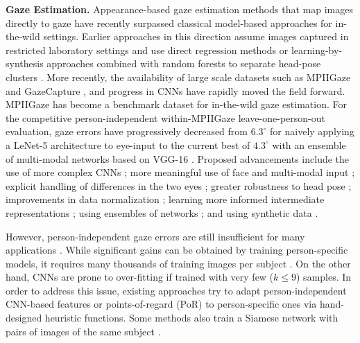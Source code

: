 \documentclass[10pt,twocolumn,letterpaper]{article}
\newcommand{\Paragraph}[1]
{\vspace{1.5mm} \noindent \textbf{#1}}
\begin{document}
\Paragraph{Gaze Estimation.}
Appearance-based gaze estimation \cite{Tan2002WACV} methods that map images directly to gaze have recently surpassed classical model-based approaches \cite{Hansen2010TPAMI} for in-the-wild settings. 
Earlier approaches in this direction assume images captured in restricted laboratory settings and use direct regression methods \cite{Lu2011ICCV,Lu2011BMVC} or learning-by-synthesis approaches combined with random forests to separate head-pose clusters \cite{Sugano2014CVPR}. 
More recently, the availability of large scale datasets such as MPIIGaze \cite{Zhang2015CVPR} and GazeCapture \cite{Krafka2016CVPR}, and progress in CNNs have rapidly moved the field forward. MPIIGaze has become a benchmark dataset for in-the-wild gaze estimation. For the competitive person-independent within-MPIIGaze leave-one-person-out evaluation, gaze errors have progressively decreased from $6.3^\circ$ for naively applying a LeNet-5 architecture to eye-input \cite{Zhang2015CVPR} to the current best of $4.3^\circ$ with an ensemble of multi-modal networks based on VGG-16 \cite{Fischer2018ECCV}.
Proposed advancements include the use of more complex CNNs \cite{Zhang2019TPAMI}; more meaningful use of face \cite{Zhang2017CVPRW, Krafka2016CVPR} and multi-modal input \cite{Krafka2016CVPR,Fischer2018ECCV,Yu2018ECCVW}; explicit handling of differences in the two eyes \cite{Cheng2018ECCV}; greater robustness to head pose \cite{zhu2017monocular, Ranjan2018CVPRW}; improvements in data normalization \cite{Zhang2018ETRA}; learning more informed intermediate representations \cite{Park2018ECCV}; using ensembles of networks \cite{Fischer2018ECCV}; and using synthetic data \cite{Shrivastava2017CVPR, Wang2018CVPR,Lee2018ICLR, Park2018ETRA, Ranjan2018CVPRW}. 

However, person-independent gaze errors are still insufficient for many applications \cite{Biedert2010CHIEA,Sibert2000UIST,Huang2016MM,Betke2002TNSRE}. While significant gains can be obtained by training person-specific models, it requires many thousands of training images per subject \cite{Zhang2019TPAMI}. On the other hand, CNNs are prone to over-fitting  if trained with very few ($k\leq9$) samples. In order to address this issue, existing approaches try to adapt person-independent CNN-based features \cite{Krafka2016CVPR, Park2018ETRA} or points-of-regard (PoR) \cite{Zhang2019CHI} to person-specific ones via hand-designed heuristic functions. Some methods also train a Siamese network with pairs of images of the same subject \cite{Liu2018BMVC}. 
\end{document}

